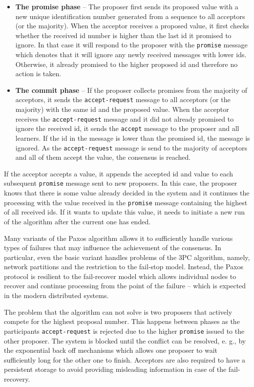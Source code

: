 \documentclass[oneside,
  digital, %
  table,   %
  nolof,     %
  nolot,     %
]{fithesis3}
\begin{document}
\begin{itemize}
    \item \textbf{The promise phase} -- The proposer first sends its proposed value with a new unique identification number generated from a sequence to all acceptors (or the majority). When the acceptor receives a proposed value, it first checks whether the received id number is higher than the last id it promised to ignore. In that case it will respond to the proposer with the \texttt{promise} message which denotes that it will ignore any newly received messages with lower ids. Otherwise, it already promised to the higher proposed id and therefore no action is taken.
    
    \item \textbf{The commit phase} -- If the proposer collects promises from the majority of acceptors, it sends the \texttt{accept-request} message to all acceptors (or the majority) with the same id and the proposed value. When the acceptor receives the \texttt{accept-request} message and it did not already promised to ignore the received id, it sends the \texttt{accept} message to the proposer and all learners. If the id in the message is lower than the promised id, the message is ignored. As the \texttt{accept-request} message is send to the majority of acceptors and all of them accept the value, the consensus is reached.
\end{itemize}

If the acceptor accepts a value, it appends the accepted id and value to each subsequent \texttt{promise} message sent to new proposers. In this case, the proposer knows that there is some value already decided in the system and it continues the processing with the value received in the \texttt{promise} message containing the highest of all received ids. If it wants to update this value, it needs to initiate a new run of the algorithm after the current one has ended. 

Many variants of the Paxos algorithm allows it to sufficiently handle various types of failures that may influence the achievement of the consensus. In particular, even the basic variant handles problems of the 3PC algorithm, namely, network partitions and the restriction to the fail-stop model. Instead, the Paxos protocol is resilient to the fail-recover model which allows individual nodes to recover and continue processing from the point of the failure -- which is expected in the modern distributed systems.

The problem that the algorithm can not solve is two proposers that actively compete for the highest proposal number. This happens between phases as the participants \texttt{accept-request} is rejected due to the higher \texttt{promise} issued to the other proposer. The system is blocked until the conflict can be resolved, e. g., by the exponential back off mechanisms which allows one proposer to wait sufficiently long for the other one to finish. Acceptors are also required to have a persistent storage to avoid providing misleading information in case of the fail-recovery.
\end{document}
